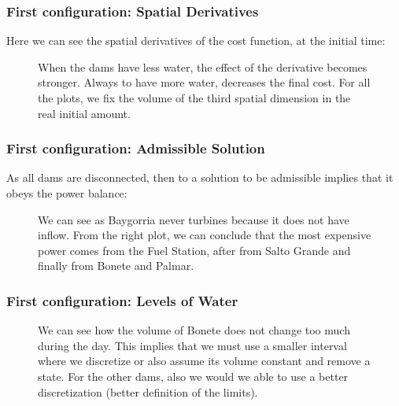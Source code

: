 \documentclass[aspectratio=169]{beamer}\usepackage[utf8]{inputenc}
\begin{document}
\begin{frame}\frametitle{First configuration: Spatial Derivatives}
Here we can see the spatial derivatives of the cost function, at the initial time:
\begin{figure}[ht!]
\centering
{}
\caption{When the dams have less water, the effect of the derivative becomes stronger. Always to have more water, decreases the final cost. For all the plots, we fix the volume of the third spatial dimension in the real initial amount.}
\end{figure}
\end{frame}

\begin{frame}\frametitle{First configuration: Admissible Solution}
As all dams are disconnected, then to a solution to be admissible implies that it obeys the power balance:
\begin{figure}[ht!]
\centering
{}
\caption{We can see as Baygorria never turbines because it does not have inflow. From the right plot, we can conclude that the most expensive power comes from the Fuel Station, after from Salto Grande and finally from Bonete and Palmar.}
\end{figure}
\end{frame}

\begin{frame}\frametitle{First configuration: Levels of Water}
\begin{figure}[ht!]
\centering
{}
\caption{We can see how the volume of Bonete does not change too much during the day. This implies that we must use a smaller interval where we discretize or also assume its volume constant and remove a state. For the other dams, also we would we able to use a better discretization (better definition of the limits).}
\end{figure}
\end{frame}
\end{document}
